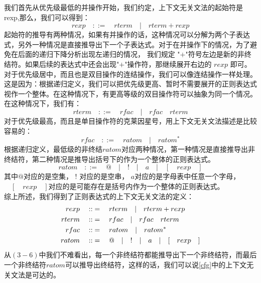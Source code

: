 \documentclass[openany,oneside]{book}
\theoremstyle{definition}
\theoremstyle{definition}
\begin{document}
	我们首先从优先级最低的并操作开始，我们约定，上下文无关文法的起始符是rexp,那么，我们可以得到：
	\begin{equation}
		rexp \quad::=\quad rterm\quad  | \quad rterm + rexp
	\end{equation}
	\indent 起始符的推导有两种情况，如果有并操作的话，这种情况可以分解为两个子表达式，另外一种情况是直接推导出下一个子表达式。对于在并操作下的情况，为了避免在后面的递归下降分析出现左递归的情况， 我们规定 "$+$"符号左边是新的非终结符。如果后续的表达式中还会出现"$+$"操作符，那继续展开右边的 $rexp$ 即可。\\
	\indent 对于优先级居中，而且也是双目操作的连结操作，我们可以像连结操作一样处理。这是因为：根据递归定义，我们可以把优先级更高、暂时不需要展开的正则表达式视作一个整体。在这种情况下，有更高等级的双目操作符可以抽象为同一个情况。在这种情况下，我们有：
	\begin{equation}
		rterm\quad::=\quad rfac\quad | \quad rfac\quad rterm
	\end{equation}
	\indent 对于优先级最高，而且是单目操作符的克莱因星号，用上下文无关文法描述是比较容易的：
	\begin{equation}
		rfac\quad::=\quad ratom \quad | \quad ratom^* 
	\end{equation}
	\indent 根据递归定义，最低级的非终结$ratom$对应两种情况，第一种情况是直接推导出非终结符，第二种情况是推导出括号下的作为一个整体的正则表达式。
	\begin{equation}
		ratom\quad::=\quad @ \quad | \quad ! \quad |\quad a \quad | \quad[\quad rexp \quad]
	\end{equation}
	\indent 其中$@$对应的是空集， $!$ 对应的是空串， $a$对应的是字母表中任意一个字母， $\quad[\quad rexp \quad]$对应的是可能存在是括号内作为一个整体的正则表达式。 \\
	\indent 综上所述，我们得到了正则表达式的上下文无关文法的定义：
	\begin{equation}\label{cfg}
		\begin{split}
			rexp \quad::&=\quad rterm\quad  | \quad rterm + rexp \hfill  \\
			rterm\quad::&=\quad rfac\quad | \quad rfac\quad rterm \hfill  \\
			rfac\quad::&=\quad ratom \quad | \quad ratom^* \hfill \\
			ratom\quad::&=\quad @ \quad | \quad ! \quad |\quad a \quad | \quad[\quad rexp \quad] \hfill 
		\end{split}
	\end{equation}
	\indent 从\(\left( 3-6\right) \)中我们不难看出，每一个非终结符都能推导出下一个非终结符，而最后一个非终结符$ratom$可以推导出终结符，这样的话，我们可以说\ref{cfg}中的上下文无关文法是可达的。
	
\end{document}

